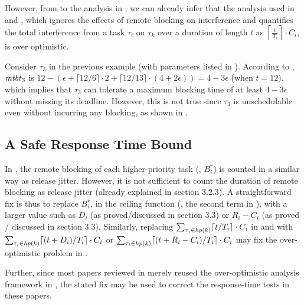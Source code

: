 However, from to the analysis in , we can already infer that the analysis used in  and , which ignores the effects of remote blocking on interference and quantifies the total interference from a task $\tau_i$ on $\tau_k$ over a duration of length $t$ as $\left \lceil \frac{t}{T_i} \right \rceil \cdot C_i$, is over optimistic. 

Consider $\tau_3$ in the previous example (with parameters listed in ). According to , $\mathit{mtbt}_3$ is $12 - (\epsilon + \lceil 12 / 6 \rceil \cdot 2 + \lceil 12 / 13 \rceil \cdot (4+2\epsilon)) = 4-3\epsilon$ (when $t=12$), which implies that $\tau_3$ can tolerate a maximum blocking time of at least $4-3\epsilon$ without missing its deadline. However, this is not true since $\tau_3$ is unschedulable even without incurring any blocking, as shown in .

\subsection{A Safe Response Time Bound}
\label{sec:safe_bound}

In , the remote blocking of each higher-priority task (\ie, $B_i^r$) is counted in a similar way as release jitter. However, it is not sufficient to count the duration of remote blocking as release jitter (already explained in section 3.2.3). A straightforward fix is thus to replace $B_i^r$, in the ceiling function (\ie, the second term in ), with a larger value such as $D_i$ (as proved/discussed in section 3.3) or $R_i - C_i$ (as proved / discussed in section 3.3). Similarly, replacing $\sum_{\tau_i \in \mathit{hp}(k)} \lceil t / T_i \rceil \cdot C_i$ in  and  with $\sum_{\tau_i \in \mathit{hp}(k)} \lceil (t+D_i) / T_i \rceil \cdot C_i$ or $\sum_{\tau_i \in \mathit{hp}(k)} \lceil (t+R_i-C_i) / T_i \rceil \cdot C_i$ may fix the over-optimistic problem in \cite{NBN:11}.

Further, since most papers reviewed in  merely reused the over-optimistic analysis framework in \cite{lakshmanan-2009}, the stated fix may be used to correct the response-time tests in these papers.